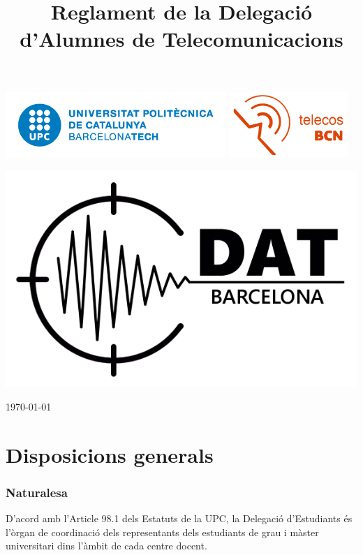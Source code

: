 \documentclass[a4paper,12pt]{article}
\title{Reglament de la Delegació d'Alumnes de Telecomunicacions}
\begin{document}
\thispagestyle{empty}
\includegraphics[height=2.5cm]{logos/upc-positiu-p3005.png}\hfill
\includegraphics[height=2.5cm]{logos/Logo_telecos_2018.png}
\vspace{6em}

\begin{center}
\includegraphics[scale=0.85]{logos/Dat_logo_10x6.png}
\vspace{1em}

\Huge
\@title
\vspace{1em}

\large
\today
\end{center}
\normalsize
\newpage

\thispagestyle{empty}
\tableofcontents
\newpage

\section{Disposicions generals}
\subsubsection{Naturalesa}
D'acord amb l'Article 98.1 dels Estatuts de la UPC, la Delegació d'Estudiants és l'òrgan de coordinació dels representants dels estudiants de grau i màster universitari dins l'àmbit de cada centre docent.
\end{document}
